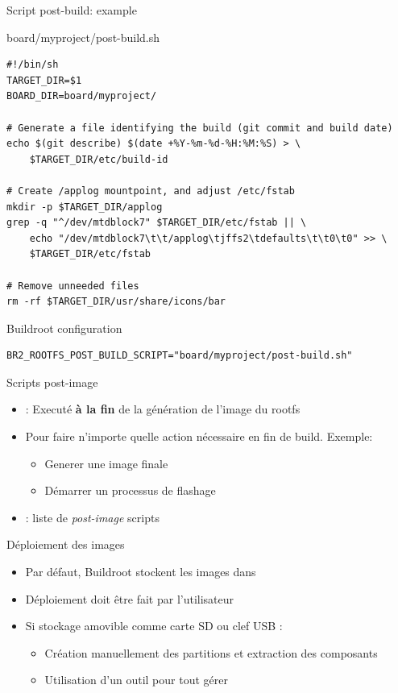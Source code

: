 \documentclass[aspectratio=169,obeyspaces,spaces,hyphens,dvipsnames]{beamer}
\begin{document}
\begin{frame}[fragile]{Script post-build: example}

\begin{block}{board/myproject/post-build.sh}
\begin{verbatim}
#!/bin/sh
TARGET_DIR=$1
BOARD_DIR=board/myproject/

# Generate a file identifying the build (git commit and build date)
echo $(git describe) $(date +%Y-%m-%d-%H:%M:%S) > \
    $TARGET_DIR/etc/build-id

# Create /applog mountpoint, and adjust /etc/fstab
mkdir -p $TARGET_DIR/applog
grep -q "^/dev/mtdblock7" $TARGET_DIR/etc/fstab || \
    echo "/dev/mtdblock7\t\t/applog\tjffs2\tdefaults\t\t0\t0" >> \
    $TARGET_DIR/etc/fstab

# Remove unneeded files
rm -rf $TARGET_DIR/usr/share/icons/bar
\end{verbatim}
\end{block}

\begin{block}{Buildroot configuration}
{\scriptsize
\begin{verbatim}
BR2_ROOTFS_POST_BUILD_SCRIPT="board/myproject/post-build.sh"
\end{verbatim}}
\end{block}

\end{frame}

\begin{frame}{Scripts post-image}
  \begin{itemize}
  \item {} : Executé \textbf{à la fin} de la génération
    de l'image du rootfs
  \item Pour faire n'importe quelle action nécessaire en fin de build. Exemple:
    \begin{itemize}
    \item Generer une image finale
    \item Démarrer un processus de flashage
    \end{itemize}
  \item {} : liste de {\em post-image} scripts
  \end{itemize}
\end{frame}

\begin{frame}{Déploiement des images}
  \begin{itemize}
  \item Par défaut, Buildroot stockent les images dans 
  \item Déploiement doit être fait par l'utilisateur
  \item Si stockage amovible comme carte SD ou clef USB :
    \begin{itemize}
    \item Création manuellement des partitions et extraction des composants
    \item Utilisation d'un outil  pour tout gérer
    \end{itemize}
  \end{itemize}
\end{frame}
\end{document}
